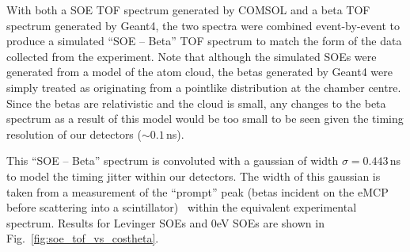 With both a SOE TOF spectrum generated by COMSOL and a beta TOF spectrum generated by Geant4, the two spectra were combined event-by-event to produce a simulated ``SOE -- Beta'' TOF spectrum to match the form of the data collected from the experiment. Note that although the simulated SOEs were generated from a model of the atom cloud, the betas generated by Geant4 were simply treated as originating from a pointlike distribution at the chamber centre.  Since the betas are relativistic and the cloud is small, any changes to the beta spectrum as a result of this model would be too small to be seen given the timing resolution of our detectors ($\sim 0.1\,$ns).  

This ``SOE -- Beta'' spectrum is convoluted with a gaussian of width $\sigma=0.443\,$ns to model the timing jitter within our detectors.  The width of this gaussian is taken from a measurement of the ``prompt'' peak (betas incident on the eMCP before scattering into a scintillator)~ within the equivalent experimental spectrum.  Results for Levinger SOEs and 0eV SOEs are shown in Fig.~\ref{fig:soe_tof_vs_costheta}.



